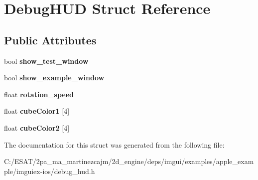 \hypertarget{struct_debug_h_u_d}{}\section{Debug\+H\+UD Struct Reference}
\label{struct_debug_h_u_d}
\subsection*{Public Attributes}
\begin{DoxyCompactItemize}
\item 
\mbox{\label{struct_debug_h_u_d_abd0790f15ede8a6d8bb35730894f7a51}} 
bool {\bfseries show\+\_\+test\+\_\+window}
\item 
\mbox{\label{struct_debug_h_u_d_a1b5725563b37b00af1e36aa4e894f868}} 
bool {\bfseries show\+\_\+example\+\_\+window}
\item 
\mbox{\label{struct_debug_h_u_d_aabd308e2f91298904ee8047752fa2eb3}} 
float {\bfseries rotation\+\_\+speed}
\item 
\mbox{\label{struct_debug_h_u_d_a1783e7ec1f52dbe1176f7ba3b47abf18}} 
float {\bfseries cube\+Color1} \mbox{[}4\mbox{]}
\item 
\mbox{\label{struct_debug_h_u_d_a7111379a7910fc759bdce31a3cbed162}} 
float {\bfseries cube\+Color2} \mbox{[}4\mbox{]}
\end{DoxyCompactItemize}


The documentation for this struct was generated from the following file\+:\begin{DoxyCompactItemize}
\item 
C\+:/\+E\+S\+A\+T/2pa\+\_\+ma\+\_\+martinezcajm/2d\+\_\+engine/deps/imgui/examples/apple\+\_\+example/imguiex-\/ios/debug\+\_\+hud.\+h\end{DoxyCompactItemize}
